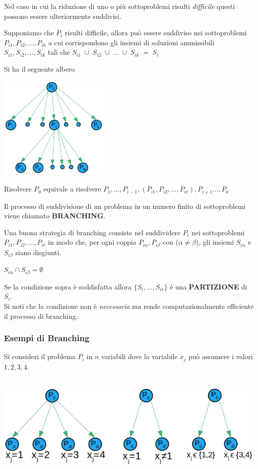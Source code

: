 Nel caso in cui la riduzione di uno o più sottoproblemi risulti \emph{difficile} questi possono essere ulteriormente suddivisi.

Supponiamo che $P_{i}$ risulti difficile, allora può essere suddiviso nei sottoproblemi $P_{i1},P_{i2},...,P_{ik}$ a cui corrispondono gli insiemi di soluzioni ammissibili $S_{i1},S_{i2},...,S_{ik}$ tali che $S_{i1}\;\cup\;S_{i2}\;\cup\;...\;\cup\;S_{ik}\;=\;S_{i}$

Si ha il seguente albero

\centerline{\includegraphics[height=5cm]{images/graph15.png}}

\noindent
Risolvere $P_{0}$ equivale a risolvere $P_{1},...,P_{i-1},(P_{i1},P_{i2},...,P_{ir}),P_{i+1}...,P_{k}$

Il processo di suddivisione di un problema in un numero finito di sottoproblemi viene chiamato \textbf{BRANCHING}.

Una buona strategia di branching consiste nel suddividere $P_{i}$ nei sottoproblemi $P_{i1},P_{i2},...,P_{ir}$ in modo che, per ogni coppia $P_{i\alpha},P_{i\beta}$ con ($\alpha \neq \beta$), gli insiemi $S_{i\alpha}$ e $S_{i\beta}$ siano disgiunti.

\centerline{$S_{i\alpha} \cap S_{i\beta} = \emptyset$}

Se la condizione sopra è soddisfatta allora $\{S_{i},...,S_{ir}\}$ è una \textbf{PARTIZIONE} di $S_{i}$.\\
Si noti che la condizione non è \emph{necessaria} ma rende computazionalmente efficiente il processo di branching.

\subsubsection{Esempi di Branching}
Si consideri il problema $P_{i}$ in $n$ variabili dove la variabile $x_{j}$ può assumere i valori $1,2,3,4$.

\centerline{\includegraphics[height=5cm]{images/graph16.png}}

